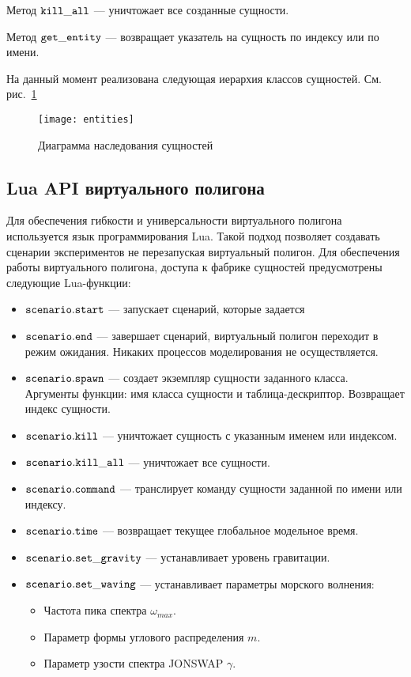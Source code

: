 Метод $\tt kill\_all$ --- уничтожает все созданные сущности.

Метод $\tt get\_entity$ --- возвращает указатель на сущность по индексу или по имени.

На данный момент реализована следующая иерархия классов сущностей. См. рис.~\ref{entities}

\begin{figure}[ht]
\begin{center}
\texttt{[image: entities]}
\end{center}
\caption{Диаграмма наследования сущностей}
\label{entities}
\end{figure}

%

\subsection{Lua API виртуального полигона}

Для обеспечения гибкости и универсальности виртуального полигона используется язык программирования Lua.
Такой подход позволяет создавать сценарии экспериментов  не перезапуская виртуальный полигон.
Для обеспечения работы виртуального полигона, доступа к фабрике сущностей предусмотрены следующие Lua-функции:

\begin{itemize}
	\item $\tt scenario.start$ --- запускает сценарий, которые задается 	
	\item $\tt scenario.end$ --- завершает сценарий, виртуальный полигон переходит в 
	режим ожидания. Никаких процессов моделирования не осуществляется.
	\item $\tt scenario.spawn$ --- создает экземпляр сущности заданного класса. Аргументы функции: имя класса сущности и таблица-дескриптор. Возвращает индекс сущности.
	\item $\tt scenario.kill$ --- уничтожает сущность с указанным именем или индексом.
	\item $\tt scenario.kill\_all$ --- уничтожает все сущности.
	\item $\tt scenario.command$ --- транслирует команду сущности заданной по имени или индексу.
	\item $\tt scenario.time$ --- возвращает текущее глобальное модельное время.
	\item $\tt scenario.set\_gravity$ --- устанавливает уровень гравитации.
	\item $\tt scenario.set\_waving$ --- устанавливает параметры морского волнения:
		\begin{itemize}
		\item Частота пика спектра $\omega_{max}$.
		\item Параметр формы углового распределения $m$.
		\item Параметр узости спектра JONSWAP $\gamma$.
		\end{itemize}
\end{itemize}


